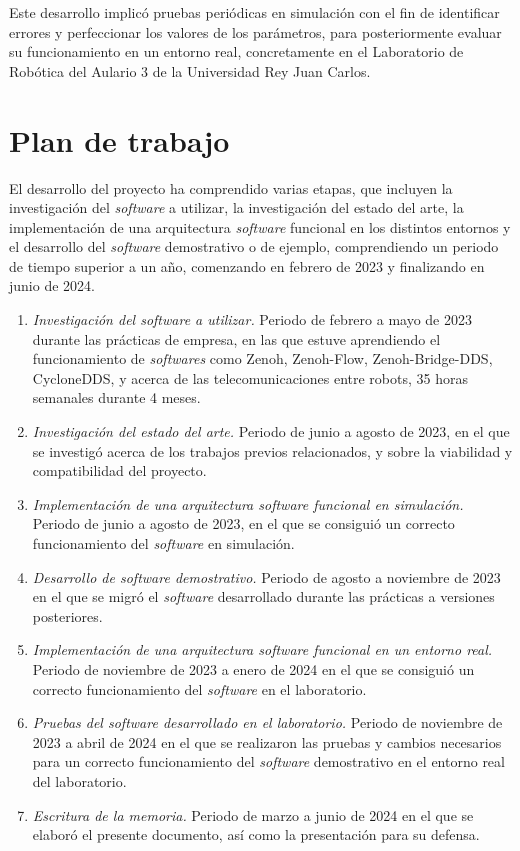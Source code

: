 Este desarrollo implicó pruebas periódicas en simulación con el fin de
identificar errores y perfeccionar los valores de los parámetros, para
posteriormente evaluar su funcionamiento en un entorno real, concretamente en el
Laboratorio de Robótica del Aulario 3 de la Universidad Rey Juan Carlos.


\section{Plan de trabajo}
\label{sec:plantrabajo}

El desarrollo del proyecto ha comprendido varias etapas, que incluyen la
investigación del \textit{software} a utilizar, la investigación del estado del
arte, la implementación de una arquitectura \textit{software} funcional en los
distintos entornos y el desarrollo del \textit{software} demostrativo o de
ejemplo, comprendiendo un periodo de tiempo superior a un año, comenzando en
febrero de 2023 y finalizando en junio de 2024.

\begin{enumerate}
    \item{\textit{Investigación del software a utilizar.} Periodo de febrero a
        mayo de 2023 durante las prácticas de empresa, en las que estuve
        aprendiendo el funcionamiento de \textit{softwares} como Zenoh,
        Zenoh-Flow, Zenoh-Bridge-DDS, CycloneDDS, y acerca de las
        telecomunicaciones entre robots, 35 horas semanales durante 4 meses.}
    \item{\textit{Investigación del estado del arte.} Periodo de junio a agosto
        de 2023, en el que se investigó acerca de los trabajos previos
        relacionados, y sobre la viabilidad y compatibilidad del proyecto.}
    \item{\textit{Implementación de una arquitectura software funcional en
        simulación.} Periodo de junio a agosto de 2023, en el que se consiguió
        un correcto funcionamiento del \textit{software} en simulación.}
    \item{\textit{Desarrollo de software demostrativo.} Periodo de agosto a
        noviembre de 2023 en el que se migró el \textit{software} desarrollado
        durante las prácticas a versiones posteriores.}
    \item{\textit{Implementación de una arquitectura software funcional en un
        entorno real.} Periodo de noviembre de 2023 a enero de 2024 en el que se
        consiguió un correcto funcionamiento del \textit{software} en el
        laboratorio.}
    \item{\textit{Pruebas del software desarrollado en el laboratorio.} Periodo
        de noviembre de 2023 a abril de 2024 en el que se realizaron las pruebas
        y cambios necesarios para un correcto funcionamiento del
        \textit{software} demostrativo en el entorno real del laboratorio.}
    \item{\textit{Escritura de la memoria.} Periodo de marzo a junio de 2024 en
        el que se elaboró el presente documento, así como la presentación para
        su defensa.}
\end{enumerate}

